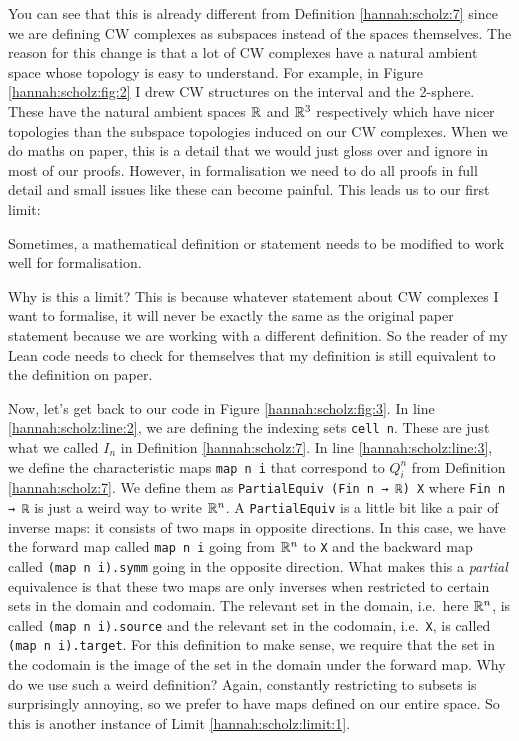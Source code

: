 You can see that this is already different from Definition \ref{hannah:scholz:7} since we are defining CW complexes as subspaces instead of the spaces themselves. The reason for this change is that a lot of CW complexes have a natural ambient space whose topology is easy to understand. For example, in Figure \ref{hannah:scholz:fig:2} I drew CW structures on the interval and the 2-sphere. These have the natural ambient spaces $\mathbb R$ and $\mathbb R^3$ respectively which have nicer topologies than the subspace topologies induced on our CW complexes. When we do maths on paper, this is a detail that we would just gloss over and ignore in most of our proofs. However, in formalisation we need to do all proofs in full detail and small issues like these can become painful. This leads us to our first limit: 

\begin{limit}\label{hannah:scholz:limit:1}
    Sometimes, a mathematical definition or statement needs to be modified to work well for formalisation. 
\end{limit}

Why is this a limit? This is because whatever statement about CW complexes I want to formalise, it will never be exactly the same as the original paper statement because we are working with a different definition. So the reader of my Lean code needs to check for themselves that my definition is still equivalent to the definition on paper. 

Now, let's get back to our code in Figure \ref{hannah:scholz:fig:3}. In line \ref{hannah:scholz:line:2}, we are defining the indexing sets \lstinline[language=lean]|cell n|. These are just what we called $I_n$ in Definition \ref{hannah:scholz:7}.
In line \ref{hannah:scholz:line:3}, we define the characteristic maps \lstinline[language=lean]|map n i| that correspond to $Q_i^n$ from Definition \ref{hannah:scholz:7}. We define them as \lstinline[language=lean]|PartialEquiv (Fin n → ℝ) X| where \lstinline[language=lean]|Fin n → ℝ| is just a weird way to write $\mathbb R^n$. A \lstinline[language=lean]|PartialEquiv| is a little bit like a pair of inverse maps: it consists of two maps in opposite directions. In this case, we have the forward map called \lstinline[language=lean]|map n i| going from $\mathbb R^n$ to \lstinline[language=lean]|X| and the backward map called \lstinline[language=lean]|(map n i).symm| going in the opposite direction. What makes this a \emph{partial} equivalence is that these two maps are only inverses when restricted to certain sets in the domain and codomain. The relevant set in the domain, i.e.\ here $\mathbb R^n$, is called \lstinline[language=lean]|(map n i).source| and the relevant set in the codomain, i.e.\ \lstinline[language=lean]|X|, is called \lstinline[language=lean]|(map n i).target|. For this definition to make sense, we require that the set in the codomain is the image of the set in the domain under the forward map. Why do we use such a weird definition? Again, constantly restricting to subsets is surprisingly annoying, so we prefer to have maps defined on our entire space. So this is another instance of Limit \ref{hannah:scholz:limit:1}. 

